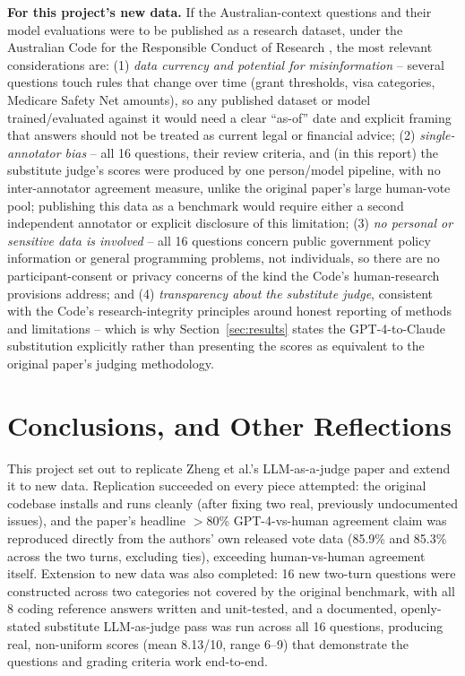 \documentclass[11pt,twocolumn]{article}
\begin{document}
\textbf{For this project's new data.} If the Australian-context questions and their model
evaluations were to be published as a research dataset, under the Australian Code for the
Responsible Conduct of Research \cite{aust_code_2018}, the most relevant considerations are: (1)
\emph{data currency and potential for misinformation} -- several questions touch rules that change
over time (grant thresholds, visa categories, Medicare Safety Net amounts), so any published dataset
or model trained/evaluated against it would need a clear ``as-of'' date and explicit framing that
answers should not be treated as current legal or financial advice; (2) \emph{single-annotator bias}
-- all 16 questions, their review criteria, and (in this report) the substitute judge's scores were
produced by one person/model pipeline, with no inter-annotator agreement measure, unlike the
original paper's large human-vote pool; publishing this data as a benchmark would require either
a second independent annotator or explicit disclosure of this limitation; (3) \emph{no personal or
sensitive data is involved} -- all 16 questions concern public government policy information or
general programming problems, not individuals, so there are no participant-consent or privacy
concerns of the kind the Code's human-research provisions address; and (4) \emph{transparency about
the substitute judge}, consistent with the Code's research-integrity principles around honest
reporting of methods and limitations -- which is why Section~\ref{sec:results} states the
GPT-4-to-Claude substitution explicitly rather than presenting the scores as equivalent to the
original paper's judging methodology.

\section{Conclusions, and Other Reflections}
\label{sec:conclusion}

This project set out to replicate Zheng et al.'s LLM-as-a-judge paper and extend
it to new data. Replication succeeded on every piece attempted: the original codebase installs and
runs cleanly (after fixing two real, previously undocumented issues), and the paper's headline
$>$80\% GPT-4-vs-human agreement claim was reproduced directly from the authors' own released vote
data (85.9\% and 85.3\% across the two turns, excluding ties), exceeding human-vs-human agreement
itself. Extension to new data was also completed: 16 new two-turn questions were constructed across
two categories not covered by the original benchmark, with all 8 coding reference answers written
and unit-tested, and a documented, openly-stated substitute LLM-as-judge pass was run across all 16
questions, producing real, non-uniform scores (mean 8.13/10, range 6--9) that demonstrate the
questions and grading criteria work end-to-end.
\end{document}
